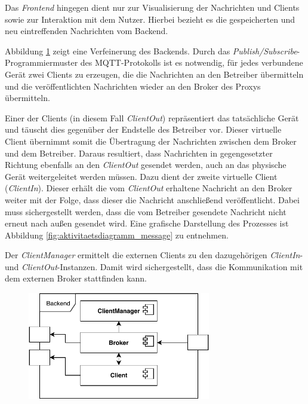     Das \emph{Frontend} hingegen dient nur zur Visualisierung der Nachrichten und Clients sowie zur Interaktion mit dem Nutzer. Hierbei bezieht es die gespeicherten und neu eintreffenden Nachrichten vom Backend.


    
    Abbildung \ref{fig:system_backend} zeigt eine Verfeinerung des Backends. 
    Durch das \emph{Publish/Subscribe}-Programmiermuster des \ac{MQTT}-Protokolls ist es notwendig, für jedes verbundene Gerät zwei Clients zu erzeugen, die die Nachrichten an den Betreiber übermitteln und die veröffentlichten Nachrichten wieder an den Broker des Proxys übermitteln.
    
    Einer der Clients (in diesem Fall \emph{ClientOut}) repräsentiert das tatsächliche Gerät und täuscht dies gegenüber der Endstelle des Betreiber vor. Dieser virtuelle Client übernimmt somit die Übertragung der Nachrichten zwischen dem Broker und dem Betreiber. Daraus resultiert, dass Nachrichten in gegengesetzter Richtung ebenfalls an den \emph{ClientOut} gesendet werden, auch an das physische Gerät weitergeleitet werden müssen. Dazu dient der zweite virtuelle Client (\emph{ClientIn}). Dieser erhält die vom \emph{ClientOut} erhaltene Nachricht an den Broker weiter mit der Folge, dass dieser die Nachricht anschließend veröffentlicht. Dabei muss sichergestellt werden, dass die vom Betreiber gesendete Nachricht nicht erneut nach außen gesendet wird.
    Eine grafische Darstellung des Prozesses ist Abbildung \ref{fig:aktivitaetsdiagramm_message} zu entnehmen.
    
    Der \emph{ClientManager} ermittelt die externen Clients zu den dazugehörigen \emph{ClientIn}- und \emph{ClientOut}-Instanzen. Damit wird sichergestellt, dass die Kommunikation mit dem externen Broker stattfinden kann.

    \begin{figure}[h]%
        \centering
        \includegraphics[width=8cm]{tex/bilder/4_konzept/Systemdiagramm_Konzept_Backend.pdf}
        \label{fig:system_backend}
    \end{figure}
    
